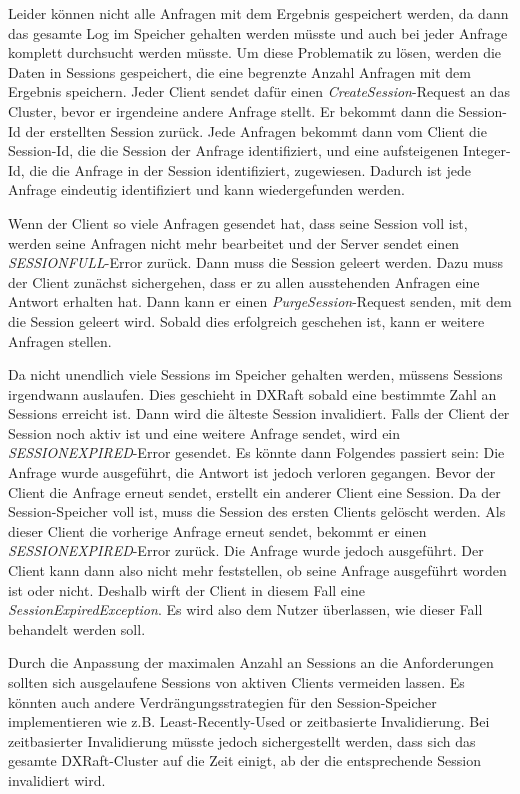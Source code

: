 Leider können nicht alle Anfragen mit dem Ergebnis gespeichert werden, da dann das gesamte Log im Speicher gehalten werden müsste und auch bei jeder Anfrage komplett durchsucht werden müsste. Um diese Problematik zu lösen, werden die Daten in Sessions gespeichert, die eine begrenzte Anzahl Anfragen mit dem Ergebnis speichern. Jeder Client sendet dafür einen \textit{CreateSession}-Request an das Cluster, bevor er irgendeine andere Anfrage stellt. Er bekommt dann die Session-Id der erstellten Session zurück. Jede Anfragen bekommt dann vom Client die Session-Id, die die Session der Anfrage identifiziert, und eine aufsteigenen Integer-Id, die die Anfrage in der Session identifiziert, zugewiesen. Dadurch ist jede Anfrage eindeutig identifiziert und kann wiedergefunden werden.

Wenn der Client so viele Anfragen gesendet hat, dass seine Session voll ist, werden seine Anfragen nicht mehr bearbeitet und der Server sendet einen \textit{SESSION\textunderscore FULL}-Error zurück. Dann muss die Session geleert werden. Dazu muss der Client zunächst sichergehen, dass er zu allen ausstehenden Anfragen eine Antwort erhalten hat. Dann kann er einen \textit{PurgeSession}-Request senden, mit dem die Session geleert wird. Sobald dies erfolgreich geschehen ist, kann er weitere Anfragen stellen.

Da nicht unendlich viele Sessions im Speicher gehalten werden, müssens Sessions irgendwann auslaufen. Dies geschieht in DXRaft sobald eine bestimmte Zahl an Sessions erreicht ist. Dann wird die älteste Session invalidiert. Falls der Client der Session noch aktiv ist und eine weitere Anfrage sendet, wird ein \textit{SESSION\textunderscore EXPIRED}-Error gesendet. Es könnte dann Folgendes passiert sein: Die Anfrage wurde ausgeführt, die Antwort ist jedoch verloren gegangen. Bevor der Client die Anfrage erneut sendet, erstellt ein anderer Client eine Session. Da der Session-Speicher voll ist, muss die Session des ersten Clients gelöscht werden. Als dieser Client die vorherige Anfrage erneut sendet, bekommt er einen \textit{SESSION\textunderscore EXPIRED}-Error zurück. Die Anfrage wurde jedoch ausgeführt. Der Client kann dann also nicht mehr feststellen, ob seine Anfrage ausgeführt worden ist oder nicht. Deshalb wirft der Client in diesem Fall eine \textit{SessionExpiredException}. Es wird also dem Nutzer überlassen, wie dieser Fall behandelt werden soll. 

Durch die Anpassung der maximalen Anzahl an Sessions an die Anforderungen sollten sich ausgelaufene Sessions von aktiven Clients vermeiden lassen. Es könnten auch andere Verdrängungsstrategien für den Session-Speicher implementieren wie z.B. Least-Recently-Used or zeitbasierte Invalidierung. Bei zeitbasierter Invalidierung müsste jedoch sichergestellt werden, dass sich das gesamte DXRaft-Cluster auf die Zeit einigt, ab der die entsprechende Session invalidiert wird.

